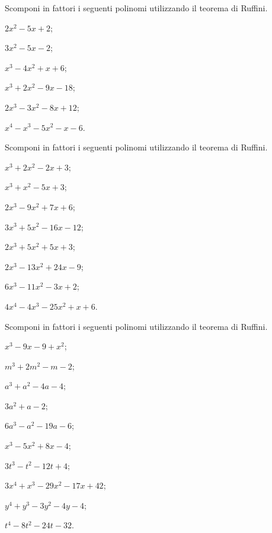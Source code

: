 \begin{esercizio}
\label{ese:13.67}
Scomponi in fattori i seguenti polinomi utilizzando il teorema di
Ruffini.
\begin{multicols}{3}
 \begin{enumeratea}
 \item $2x^{2}-5x+2$;
\item $3x^{2}-5x-2$;
\item $x^{3}-4x^{2}+x+6$;
\item $x^{3}+2x^{2}-9x-18$;
\item $2x^{3}-3x^{2}-8x+12$;
\item $x^{4}-x^{3}-5x^{2}-x-6$.
 \end{enumeratea}
\end{multicols}
\end{esercizio}

\begin{esercizio}[\Ast]
\label{ese:13.68}
Scomponi in fattori i seguenti polinomi utilizzando il teorema di
Ruffini.
\begin{multicols}{2}
 \begin{enumeratea}
\item $x^{3}+2x^{2}-2x+3$;
\item $x^{3}+x^{2}-5x+3$;
\item $2x^{3}-9x^{2}+7x+6$;
\item $3x^{3}+5x^{2}-16x-12$;
\item $2x^{3}+5x^{2}+5x+3$;
\item $2x^{3}-13x^{2}+24x-9$;
\item $6x^{3}-11x^{2}-3x+2$;
\item $4x^{4}-4x^{3}-25x^{2}+x+6$.
 \end{enumeratea}
\end{multicols}
\end{esercizio}

\begin{esercizio}[\Ast]
\label{ese:13.69}
Scomponi in fattori i seguenti polinomi utilizzando il teorema di
Ruffini.
\begin{multicols}{2}
 \begin{enumeratea}
 \item $x^{3}-9x-9+x^{2}$;
\item $m^{3}+2m^{2}-m-2$;
\item $a^{3}+a^{2}-4a-4$;
\item $3a^{2}+a-2$;
\item $6a^{3}-a^{2}-19a-6$;
\item $x^{3}-5x^{2}+8x-4$;
\item $3t^{3}-t^{2}-12t+4$;
\item $3x^{4}+x^{3}-29x^{2}-17x+42$;
\item $y^{4}+y^{3}-3y^{2}-4y-4$;
\item $t^{4}-8t^{2}-24t-32$.
 \end{enumeratea}
\end{multicols}
\end{esercizio}

